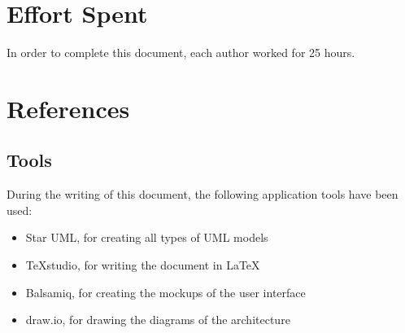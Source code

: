 \documentclass[11pt,a4paper]{report}
\begin{document}
\chapter{Effort Spent}
In order to complete this document, each author worked for 25 hours.
\chapter{References}
\section{Tools}
During the writing of this document, the following application tools have been used:
\begin{itemize}
	\item Star UML, for creating all types of UML models
	\item TeXstudio, for writing the document in \LaTeX
	\item Balsamiq, for creating the mockups of the user interface
	\item draw.io, for drawing the diagrams of the architecture
\end{itemize}
\end{document}

